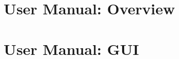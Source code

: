 \chapter{\dabc\ User Manual: Overview}
 \cleardoublepage
\chapter{\dabc\ User Manual: GUI}
 \cleardoublepage

